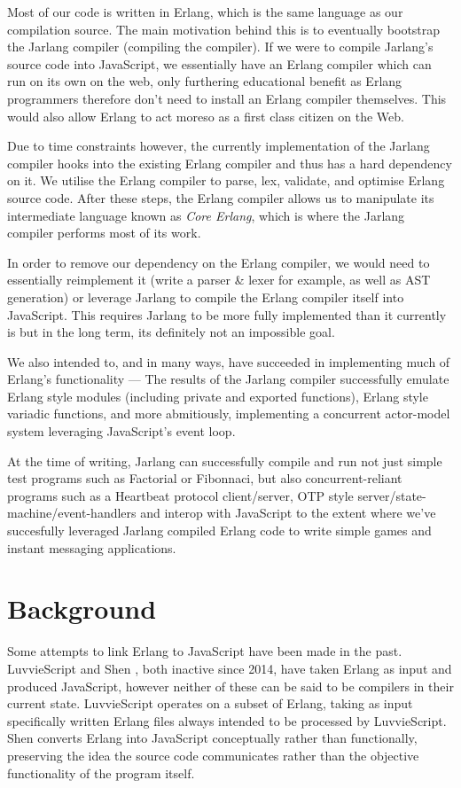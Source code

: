 \documentclass[twoside,12pt,titlepage,a4paper]{article}
\begin{document}
Most of our code is written in Erlang, which is the same language as our compilation source. The main motivation behind this is to eventually bootstrap the Jarlang compiler (compiling the compiler). If we were to compile Jarlang's source code into JavaScript, we essentially have an Erlang compiler which can run on its own on the web, only furthering educational benefit as Erlang programmers therefore don't need to install an Erlang compiler themselves. This would also allow Erlang to act moreso as a first class citizen on the Web.

Due to time constraints however, the currently implementation of the Jarlang compiler hooks into the existing Erlang compiler and thus has a hard dependency on it. We utilise the Erlang compiler to parse, lex, validate, and optimise Erlang source code. After these steps, the Erlang compiler allows us to manipulate its intermediate language known as \textit{Core Erlang}, which is where the Jarlang compiler performs most of its work.

In order to remove our dependency on the Erlang compiler, we would need to essentially reimplement it (write a parser \& lexer for example, as well as AST generation) or leverage Jarlang to compile the Erlang compiler itself into JavaScript. This requires Jarlang to be more fully implemented than it currently is but in the long term, its definitely not an impossible goal.

We also intended to, and in many ways, have succeeded in implementing much of Erlang's functionality --- The results of the Jarlang compiler successfully emulate Erlang style modules (including private and exported functions), Erlang style variadic functions, and more abmitiously, implementing a concurrent actor-model system leveraging JavaScript's event loop.

At the time of writing, Jarlang can successfully compile and run not just simple test programs such as Factorial or Fibonnaci, but also concurrent-reliant programs such as a Heartbeat protocol client/server, OTP style server/state-machine/event-handlers and interop with JavaScript to the extent where we've succesfully leveraged Jarlang compiled Erlang code to write simple games and instant messaging applications.

\section{Background}
\label{Background}

Some attempts to link Erlang to JavaScript have been made in the past. LuvvieScript \citep{luvvieGitHub} and Shen \citep{ShenGitHub}, both inactive since 2014, have taken Erlang as input and produced JavaScript, however neither of these can be said to be compilers in their current state. LuvvieScript operates on a subset of Erlang, taking as input specifically written Erlang files always intended to be processed by LuvvieScript. Shen converts Erlang into JavaScript conceptually rather than functionally, preserving the idea the source code communicates rather than the objective functionality of the program itself.
\end{document}
